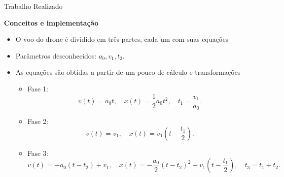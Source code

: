 \documentclass[aspectratio=169]{beamer}
\begin{document}
\begin{frame}{Trabalho Realizado}

\textbf{Conceitos e implementação}

\begin{itemize}
    \item O voo do drone é dividido em três partes, cada um com suas
        equações
    \item Parâmetros desconhecidos: $a_0, v_1, t_2$.
    \item As equações são obtidas a partir de um pouco de cálculo e
        transformações
        \begin{itemize}
            \item Fase 1: \begin{equation}
                    v(t) = a_0 t, \quad
                    x(t) = \frac12 a_0 t^2, \quad
                    t_1 = \frac{v_1}{a_0}.
                \end{equation}
            \item Fase 2:
                \begin{equation}
                    v(t) = v_1, \quad
                    x(t) = v_1 \left( t - \frac{t_1}2 \right).
                \end{equation}
            \item Fase 3:
                \begin{equation}
                    v(t) = -a_0 (t - t_2) + v_1, \quad
                    x(t) = -\frac{a_0}2 (t-t_2)^2 + v_1 \left( t - \frac{t_1}2 \right), \quad
                    t_3 = t_1 + t_2.
                \end{equation}
        \end{itemize}
\end{itemize}

\end{frame}
\end{document}
